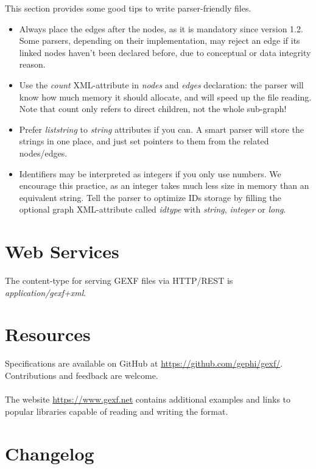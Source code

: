 \documentclass[a4paper,10pt]{article}
\begin{document}
This section provides some good tips to write parser-friendly files.
\begin{itemize}
 \item Always place the edges after the nodes, as it is mandatory since version 1.2. Some parsers, depending on their implementation, may reject an edge if its linked nodes haven't been declared before, due to conceptual or data integrity reason.
 \item Use the \textit{count} XML-attribute in \textit{nodes} and \textit{edges} declaration: the parser will know how much memory it should allocate, and will speed up the file reading. Note that count only refers to direct children, not the whole sub-graph!
 \item Prefer \textit{liststring} to \textit{string} attributes if you can. A smart parser will store the strings in one place, and just set pointers to them from the related nodes/edges.
 \item Identifiers may be interpreted as integers if you only use numbers. We encourage this practice, as an integer takes much less size in memory than an equivalent string. Tell the parser to optimize IDs storage by filling the optional graph XML-attribute called \textit{idtype} with \textit{string}, \textit{integer} or \textit{long}.
\end{itemize}

\section{Web Services} \label{ws}

The content-type for serving GEXF files via HTTP/REST is \textit{application/gexf+xml}.

\section{Resources} \label{resources}

Specifications are available on GitHub at \href{https://github.com/gephi/gexf/}{https://github.com/gephi/gexf/}. Contributions and feedback are welcome.

\paragraph{}
The website \href{https://www.gexf.net}{https://www.gexf.net} contains additional examples and links to popular libraries capable of reading and writing the format.

\section{Changelog} \label{changelog}
\end{document}
